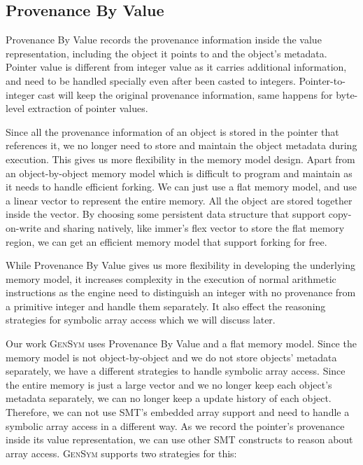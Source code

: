 \documentclass[sigplan, nonacm]{acmart}\settopmatter{printfolios=true,printccs=false,printacmref=false}
\newcommand{\tool}{\textsc{GenSym}\xspace}
\begin{document}
\subsection[short]{Provenance By Value}
Provenance By Value records the provenance information inside the value representation, including the object it points to and the object's metadata. Pointer value is different from integer value as it carries additional information, and need to be handled specially even after been casted to integers. Pointer-to-integer cast will keep the original provenance information, same happens for byte-level extraction of pointer values.\par
Since all the provenance information of an object is stored in the pointer that references it, we no longer need to store and maintain the object metadata during execution. This gives us more flexibility in the memory model design. Apart from an object-by-object memory model which is difficult to program and maintain as it needs to handle efficient forking. We can just use a flat memory model, and use a linear vector to represent the entire memory. All the object are stored together inside the vector. By choosing some persistent data structure that support copy-on-write and sharing natively, like immer's flex vector\cite{puente2017persistence} to store the flat memory region, we can get an efficient memory model that support forking for free.\par
While Provenance By Value gives us more flexibility in developing the underlying memory model, it increases complexity in the execution of normal arithmetic instructions as the engine need to distinguish an integer with no provenance from a primitive integer and handle them separately. It also effect the reasoning strategies for symbolic array access which we will discuss later.\par
Our work \tool uses Provenance By Value and a flat memory model. Since the memory model is not object-by-object and we do not store objects' metadata separately, we have a different strategies to handle symbolic array access. Since the entire memory is just a large vector and we no longer keep each object's metadata separately, we can no longer keep a update history of each object. Therefore, we can not use SMT's embedded array support and need to handle a symbolic array access in a different way. As we record the pointer's provenance inside its value representation, we can use other SMT constructs to reason about array access. \tool supports two strategies for this:
\end{document}
